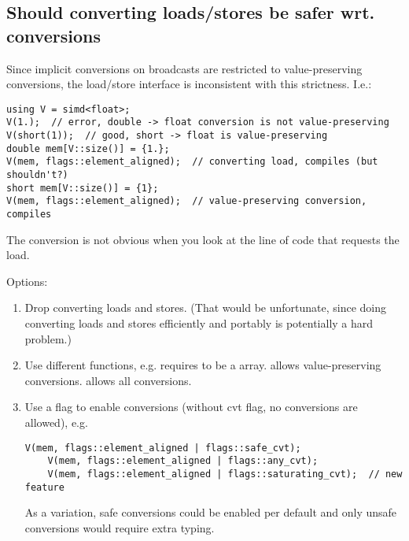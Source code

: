\subsection{Should converting loads/stores be safer wrt. conversions} \ghfeedback
Since implicit conversions on broadcasts are restricted to value-preserving conversions, the load/store interface is inconsistent with this strictness.
I.e.:
\medskip\begin{lstlisting}[style=Vc]
using V = simd<float>;
V(1.);  // error, double -> float conversion is not value-preserving
V(short(1));  // good, short -> float is value-preserving
double mem[V::size()] = {1.};
V(mem, flags::element_aligned);  // converting load, compiles (but shouldn't?)
short mem[V::size()] = {1};
V(mem, flags::element_aligned);  // value-preserving conversion, compiles
\end{lstlisting}

The conversion is not obvious when you look at the line of code that requests the load.

Options:
\begin{enumerate}
  \item Drop converting loads and stores.
    (That would be unfortunate, since doing converting loads and stores efficiently and portably is potentially a hard problem.)

  \item Use different functions, e.g.  requires  to be a  array.  allows value-preserving conversions.
     allows all conversions.

  \item Use a flag to enable conversions (without cvt flag, no conversions are allowed), e.g.
    \begin{lstlisting}[style=Vc]
    V(mem, flags::element_aligned | flags::safe_cvt);
    V(mem, flags::element_aligned | flags::any_cvt);
    V(mem, flags::element_aligned | flags::saturating_cvt);  // new feature
    \end{lstlisting}
    As a variation, safe conversions could be enabled per default and only unsafe conversions would require extra typing.

\end{enumerate}

